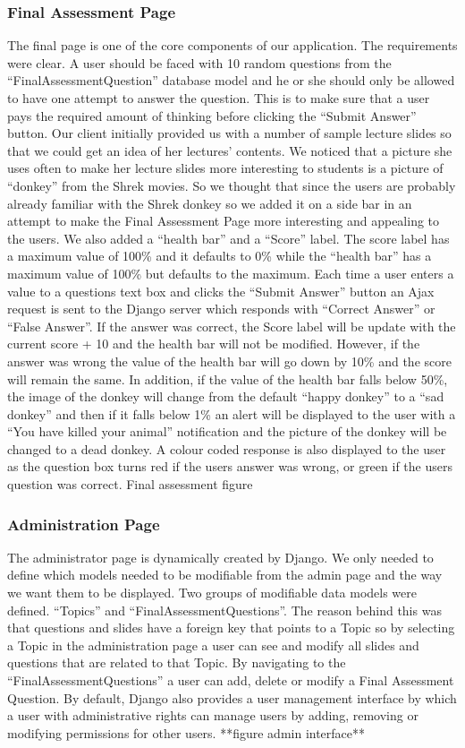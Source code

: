 \documentclass{l3proj}
\begin{document}
{\subsubsection{Final Assessment Page}
The final page is one of the core components of our application. The requirements were clear. A user should be faced with 10 random questions from the “FinalAssessmentQuestion” database model and he or she should only be allowed to have one attempt to answer the question. This is to make sure that a user pays the required amount of thinking before clicking the “Submit Answer” button. Our client initially provided us with a number of sample lecture slides so that we could get an idea of her lectures’ contents. We noticed that a picture she uses often to make her lecture slides more interesting to students is a picture of “donkey” from the Shrek movies. So we thought that since the users are probably already familiar with the Shrek donkey so we added it on a side bar in an attempt to make the Final Assessment Page more interesting and appealing to the users. We also added a “health bar” and a “Score” label. The score label has a maximum value of 100\% and it defaults to 0\% while the “health bar” has a maximum value of 100\% but defaults to the maximum. Each time a user enters a value to a questions text box and clicks the “Submit Answer” button an Ajax request is sent to the Django server which responds with “Correct Answer” or “False Answer”. If the answer was correct, the Score label will be update with the current score + 10 and the health bar will not be modified. However, if the answer was wrong the value of the health bar will go down by 10\% and the score will remain the same.  In addition, if the value of the health bar falls below 50\%, the image of the donkey will change from the default “happy donkey” to a “sad donkey” and then if it falls below 1\% an alert will be displayed to the user with a “You have killed your animal” notification and the picture of the donkey will be changed to a dead donkey.  A colour coded response is also displayed to the user as the question box turns red if the users answer was wrong, or green if the users question was correct. 
Final assessment figure
\subsubsection{Administration Page}
The administrator page is dynamically created by Django. We only needed to define which models needed to be modifiable from the admin page and the  way we want them to be displayed.  Two groups of modifiable data models were defined. “Topics” and “FinalAssessmentQuestions”. The reason behind this was that questions and slides have a foreign key that points to a Topic so by selecting a Topic in the administration page a user can see and modify all slides and questions that are related to that Topic. By navigating to the “FinalAssessmentQuestions” a user can add, delete or modify a Final Assessment Question. By default, Django also provides a user management interface by which  a user with administrative rights can manage users by adding, removing or modifying permissions for other users.
**figure admin interface**

}
\end{document}
